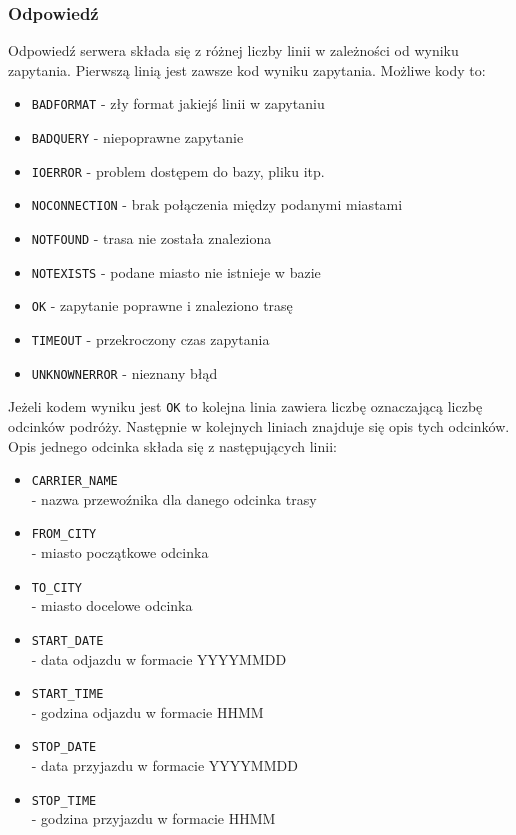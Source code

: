 \documentclass[pdftex,13pt,a4paper]{article}
\begin{document}
\subsubsection{Odpowiedź}

Odpowiedź serwera składa się z różnej liczby linii w zależności od wyniku zapytania.
\newline
Pierwszą linią jest zawsze kod wyniku zapytania. 
Możliwe kody to:
\begin{itemize}
\item \texttt{BADFORMAT} - zły format jakiejś linii w zapytaniu
\item \texttt{BADQUERY} - niepoprawne zapytanie
\item \texttt{IOERROR} - problem dostępem do bazy, pliku itp.
\item \texttt{NOCONNECTION} - brak połączenia między podanymi miastami
\item \texttt{NOTFOUND} - trasa nie została znaleziona
\item \texttt{NOTEXISTS} - podane miasto nie istnieje w bazie
\item \texttt{OK} - zapytanie poprawne i znaleziono trasę
\item \texttt{TIMEOUT} - przekroczony czas zapytania
\item \texttt{UNKNOWNERROR} - nieznany błąd
\end{itemize}

Jeżeli kodem wyniku jest \texttt{OK} to kolejna linia zawiera liczbę oznaczającą liczbę odcinków podróży. Następnie w kolejnych liniach znajduje się opis tych odcinków. Opis jednego odcinka składa się z następujących linii:
\begin{itemize}
\item \texttt{CARRIER\_NAME}\\
- nazwa przewoźnika dla danego odcinka trasy
\item \texttt{FROM\_CITY}\\
- miasto początkowe odcinka
\item \texttt{TO\_CITY}\\
- miasto docelowe odcinka
\item \texttt{START\_DATE}\\
- data odjazdu w formacie YYYYMMDD
\item \texttt{START\_TIME}\\
- godzina odjazdu w formacie HHMM
\item \texttt{STOP\_DATE}\\
- data przyjazdu w formacie YYYYMMDD
\item \texttt{STOP\_TIME}\\
- godzina przyjazdu w formacie HHMM
\end{itemize}
\end{document}
